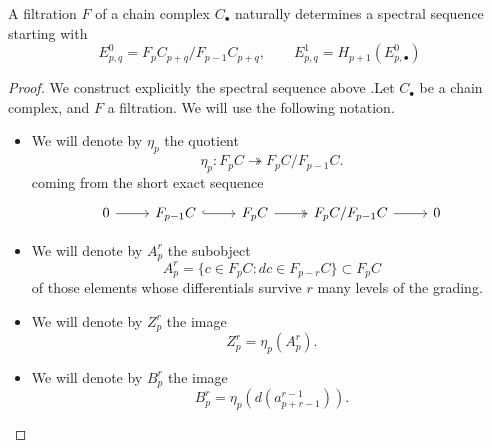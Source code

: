 \documentclass[main.tex]{subfiles}
\begin{document}
\begin{theorem}
  \label{thm:filtered_spectral_sequence_construction_thereom}
  A filtration $F$ of a chain complex $C_{\bullet}$ naturally determines a spectral sequence starting with
  \begin{equation*}
    E^{0}_{p,q} = F_{p}C_{p+q}/F_{p-1}C_{p+q},\qquad E^{1}_{p,q} = H_{p+1}(E^{0}_{p,
    \bullet})
  \end{equation*}
\end{theorem}
\begin{proof}
  We construct explicitly the spectral sequence above .Let $C_{\bullet}$ be a chain complex, and $F$ a filtration. We will use the following notation.
  \begin{itemize}
    \item We will denote by $\eta_{p}$ the quotient
      \begin{equation*}
        \eta_{p}\colon F_{p}C \twoheadrightarrow F_{p}C/F_{p-1}C.
      \end{equation*}
      coming from the short exact sequence
      \begin{equation*}
        \begin{tikzcd}
          0
          \arrow[r]
          & F_{p-1}C
          \arrow[r, hook]
          & F_{p}C
          \arrow[r, two heads]
          & F_{p}C/F_{p-1}C
          \arrow[r]
          & 0
        \end{tikzcd}
      \end{equation*}

    \item We will denote by $A^{r}_{p}$ the subobject
      \begin{equation*}
        A^{r}_{p} = \{c \in F_{p}C\colon dc \in F_{p-r}C\} \subset F_{p}C
      \end{equation*}
      of those elements whose differentials survive $r$ many levels of the grading.

    \item We will denote by $Z^{r}_{p}$ the image
      \begin{equation*}
        Z^{r}_{p} = \eta_{p}(A^{r}_{p}).
      \end{equation*}

    \item We will denote by $B^{r}_{p}$ the image
      \begin{equation*}
        B^{r}_{p} = \eta_{p}(d(a^{r-1}_{p+r-1})).
      \end{equation*}
  \end{itemize}


\end{proof}
\end{document}
